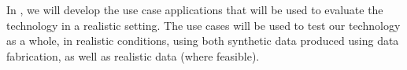 \begin{Workpackage}{\thewpno}
\begin{Task}
\TaskResults{%
\ref{del:eval1},
\ref{del:eval2},
\ref{del:eval3}
}
\TaskHeader{}
In \theTask{}, we will develop the use case applications that will be used to evaluate the \TheProject{} technology in a realistic setting. The use cases will be used to test our technology as a whole, in realistic conditions, using both synthetic data produced using data fabrication, as well as realistic data (where feasible). 


\end{Task}
\end{Workpackage}
